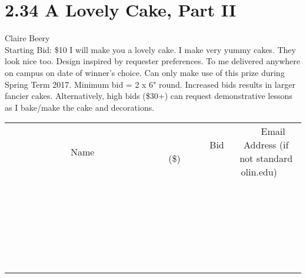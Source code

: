 \documentclass[11pt]{article}
\begin{document}
\section*{2.34 A Lovely Cake, Part II}
Claire Beery
\\
Starting Bid: \$10
\newline
I will make you a lovely cake. I make very yummy cakes. They look nice too. Design inspired by requester preferences. To me delivered anywhere on campus on date of winner's choice. Can only make use of this prize during Spring Term 2017. Minimum bid = 2 x 6" round. Increased bids results in larger fancier cakes. Alternatively, high bids (\$30+) can request demonstrative lessons as I bake/make the cake and decorations.
\\[6ex]
\begin{tabular}{c c c}
~~~~~~~~~~~~~Name~~~~~~~~~~~~~ & ~~~~~~~~~Bid (\$)~~~~~~~~~  & ~~~Email Address (if not standard olin.edu)~~~\\
 & & \\
\hline
 & & \\
\hline
 & & \\
\hline
 & & \\
\hline
 & & \\
\hline
 & & \\
\hline
 & & \\
\hline
 & & \\
\hline
 & & \\
\hline
 & & \\
\hline
 & & \\
\hline
 & & \\
\hline
 & & \\
\hline
 & & \\
\hline
 & & \\
\hline
 & & \\
\hline
 & & \\
\hline
 & & \\
\hline
 & & \\
\hline
 & & \\
\hline
 & & \\
\hline
 & & \\
\hline
 & & \\
\hline
 & & \\
\hline
 & & \\
\hline
 & & \\
\hline
\end{tabular}
\newpage
\end{document}
